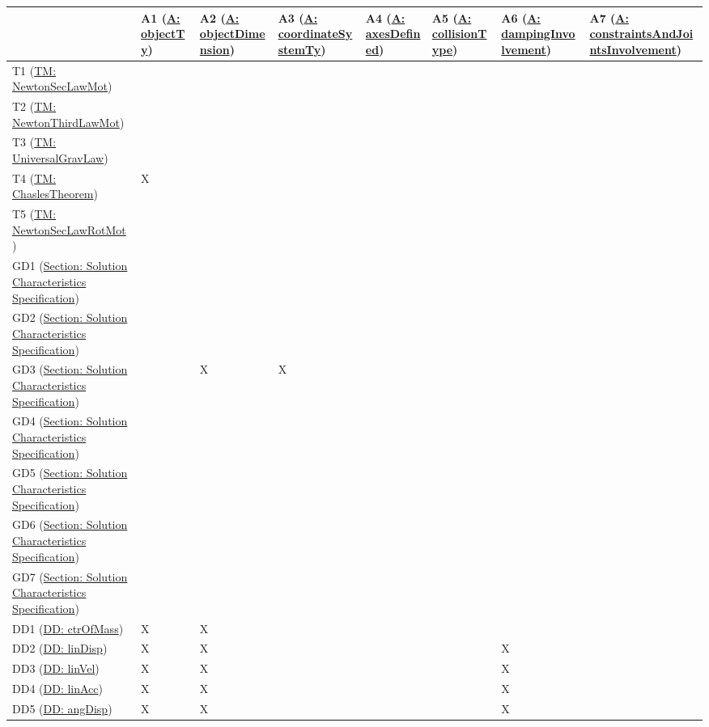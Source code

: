 \documentclass[12pt]{article}
\begin{document}
\begin{longtable}{l l l l l l l l}
\toprule
 & A1 (\hyperref[A:objectTy]{A: objectTy}) & A2 (\hyperref[A:objectDimension]{A: objectDimension}) & A3 (\hyperref[A:coordinateSystemTy]{A: coordinateSystemTy}) & A4 (\hyperref[A:axesDefined]{A: axesDefined}) & A5 (\hyperref[A:collisionType]{A: collisionType}) & A6 (\hyperref[A:dampingInvolvement]{A: dampingInvolvement}) & A7 (\hyperref[A:constraintsAndJointsInvolvement]{A: constraintsAndJointsInvolvement})
\\
\midrule
T1 (\hyperref[T:newtonSL]{TM: NewtonSecLawMot}) &  &  &  &  &  &  & 
\\
T2 (\hyperref[T:newtonTL]{TM: NewtonThirdLawMot}) &  &  &  &  &  &  & 
\\
T3 (\hyperref[T:newtonLUG]{TM: UniversalGravLaw}) &  &  &  &  &  &  & 
\\
T4 (\hyperref[T:chaslesThm]{TM: ChaslesTheorem}) & X &  &  &  &  &  & 
\\
T5 (\hyperref[T:newtonSLR]{TM: NewtonSecLawRotMot}) &  &  &  &  &  &  & 
\\
GD1 (\hyperref[Sec:SolCharSpec]{Section: Solution Characteristics Specification}) &  &  &  &  &  &  & 
\\
GD2 (\hyperref[Sec:SolCharSpec]{Section: Solution Characteristics Specification}) &  &  &  &  &  &  & 
\\
GD3 (\hyperref[Sec:SolCharSpec]{Section: Solution Characteristics Specification}) &  & X & X &  &  &  & 
\\
GD4 (\hyperref[Sec:SolCharSpec]{Section: Solution Characteristics Specification}) &  &  &  &  &  &  & 
\\
GD5 (\hyperref[Sec:SolCharSpec]{Section: Solution Characteristics Specification}) &  &  &  &  &  &  & 
\\
GD6 (\hyperref[Sec:SolCharSpec]{Section: Solution Characteristics Specification}) &  &  &  &  &  &  & 
\\
GD7 (\hyperref[Sec:SolCharSpec]{Section: Solution Characteristics Specification}) &  &  &  &  &  &  & 
\\
DD1 (\hyperref[DD:ctrOfMass]{DD: ctrOfMass}) & X & X &  &  &  &  & 
\\
DD2 (\hyperref[DD:linDisp]{DD: linDisp}) & X & X &  &  &  & X & 
\\
DD3 (\hyperref[DD:linVel]{DD: linVel}) & X & X &  &  &  & X & 
\\
DD4 (\hyperref[DD:linAcc]{DD: linAcc}) & X & X &  &  &  & X & 
\\
DD5 (\hyperref[DD:angDisp]{DD: angDisp}) & X & X &  &  &  & X & 

\end{longtable}
\end{document}
